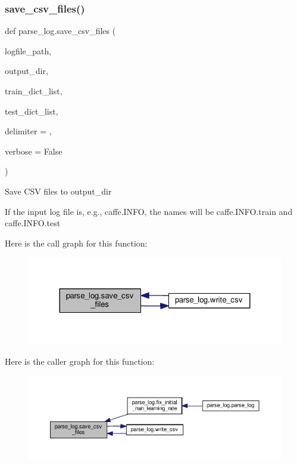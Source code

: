 \subsubsection{\texorpdfstring{save\+\_\+csv\+\_\+files()}{save\_csv\_files()}}
{\footnotesize\ttfamily def parse\+\_\+log.\+save\+\_\+csv\+\_\+files (\begin{DoxyParamCaption}\item[{}]{logfile\+\_\+path,  }\item[{}]{output\+\_\+dir,  }\item[{}]{train\+\_\+dict\+\_\+list,  }\item[{}]{test\+\_\+dict\+\_\+list,  }\item[{}]{delimiter = {\ttfamily \textquotesingle{}},  }\item[{}]{verbose = {\ttfamily False} }\end{DoxyParamCaption})}

\begin{DoxyVerb}Save CSV files to output_dir

If the input log file is, e.g., caffe.INFO, the names will be
caffe.INFO.train and caffe.INFO.test
\end{DoxyVerb}
 Here is the call graph for this function\+:
\nopagebreak
\begin{figure}[H]
\begin{center}
\leavevmode
\includegraphics[width=324pt]{namespaceparse__log_a6541ec62fedcd2928543ff22ec4401b3_cgraph}
\end{center}
\end{figure}
Here is the caller graph for this function\+:
\nopagebreak
\begin{figure}[H]
\begin{center}
\leavevmode
\includegraphics[width=350pt]{namespaceparse__log_a6541ec62fedcd2928543ff22ec4401b3_icgraph}
\end{center}
\end{figure}
\mbox{\label{namespaceparse__log_a485ed97888fccc67e8067cb51ce03db4}} 
